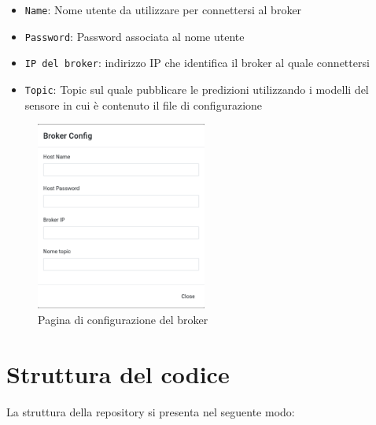 \documentclass{rapportECL}
\begin{document}
\begin{enumerate}
  \begin{itemize}
    \item \texttt{Name}: Nome utente da utilizzare per connettersi al broker
    \item \texttt{Password}: Password associata al nome utente
    \item \texttt{IP del broker}: indirizzo IP che identifica il broker al quale connettersi
    \item \texttt{Topic}: Topic sul quale pubblicare le predizioni utilizzando i modelli del sensore in cui è contenuto il file di configurazione
  \end{itemize}
\end{enumerate}


\begin{figure}[htp]
  \centering
  \includegraphics[width=0.5\textwidth]{images/img10.png}
  \caption{Pagina di configurazione del broker}
\end{figure}

\chapter{Struttura del codice}
\label{cha:struttura}

La struttura della repository si presenta nel seguente modo:

~
\end{document}
